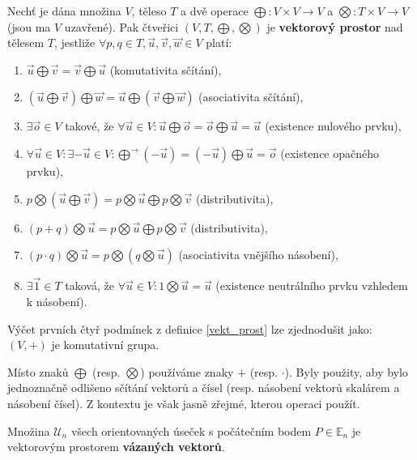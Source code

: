 \begin{definition}\label{vekt_prost}
    Nechť je dána množina $V$, těleso $T$ a dvě operace $\bigoplus: V\times V \to V$ a
    $\bigotimes: T\times V \to V$ (jsou ma $V$ uzavřené). Pak čtveřici $(V,T,\bigoplus,
    \bigotimes)$ je \textbf{vektorový prostor} nad tělesem $T$, jestliže $\forall p,q \in T, \vec u,
    \vec v, \vec w \in V$ platí:
    \begin{enumerate}[$i.$]
    \item $\vec u \bigoplus \vec v = \vec v \bigoplus \vec u$ (komutativita sčítání),
   	\item $(\vec u \bigoplus \vec v)\bigoplus \vec w = \vec u \bigoplus (\vec v \bigoplus \vec w)$ (asociativita sčítání),
   	\item $\exists \vec o\in V$ takové, že $\forall \vec u\in V:\vec u \bigoplus \vec o = \vec o \bigoplus \vec u = \vec u$ (existence nulového prvku),
   	\item $\forall \vec u \in V: \exists -\vec u \in V: \vec \bigoplus (-\vec u) = (-\vec u) \bigoplus \vec u = \vec o$ (existence opačného prvku),
   	\item $p\bigotimes (\vec u \bigoplus \vec v)=p\bigotimes \vec u \bigoplus p\bigotimes \vec v$ (distributivita),
   	\item $(p+q)\bigotimes \vec u=p\bigotimes \vec u \bigoplus p\bigotimes \vec v$ (distributivita),
   	\item $(p\cdot q)\bigotimes \vec u = p\bigotimes (q\bigotimes \vec u)$ (asociativita vnějšího násobení),
   	\item $\exists \vec 1 \in T$ taková, že $\forall \vec u \in V: 1\bigotimes \vec u = \vec u$ (existence neutrálního prvku vzhledem k násobení).
    \end{enumerate}
\end{definition}

\begin{pozn}
    Výčet prvních čtyř podmínek z definice \ref{vekt_prost} lze zjednodušit jako:
    $(V,+)$ je komutativní grupa.
\end{pozn}

\begin{pozn}
    Místo znaků $\bigoplus$ (resp. $\bigotimes$) používáme znaky $+$ (resp. $\cdot$).
    Byly použity, aby bylo jednoznačně odlišeno sčítání vektorů a čísel (resp. násobení
    vektorů skalárem a násobení čísel). Z kontextu je však jasně zřejmé, kterou operaci
    použít.
\end{pozn}

\begin{pozn}
    Množina $\mathscr U_n$ všech orientovaných úseček s počátečním bodem $P\in \mathbb E_n$
    je vektorovým prostorem
    \textbf{vázaných vektorů}.
\end{pozn}

